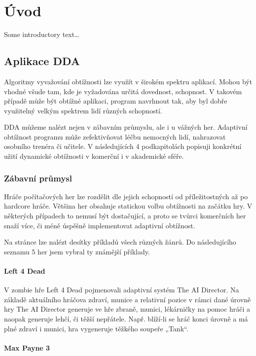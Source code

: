 \chapter{Úvod}
Some introductory text\dots

\section{Aplikace DDA}
Algoritmy vyvažování obtížnosti lze využít v širokém spektru aplikací. Mohou být vhodné všude tam, kde je vyžadována určitá dovednost, schopnost. V takovém případě může být obtížné aplikaci, program navrhnout tak, aby byl dobře využitelný velkým spektrem lidí různých schopností.

DDA můžeme nalézt nejen v zábavním průmyslu, ale i u vážných her. Adaptivní obtížnost programu může zefektivňovat léčbu nemocných lidí, nahrazovat osobního trenéra či učitele. V následujících 4 podkapitolách popisuji konkrétní užití dynamické obtížnosti v komerční i v akademické sféře.

\subsection{Zábavní průmysl}

Hráče počítačových her lze rozdělit dle jejich schopností od příležitostných až po hardcore hráče. Většina her obsahuje statickou volbu obtížnosti na začátku hry. V některých případech to nemusí být dostačující, a proto se tvůrci komerčních her snaží více, či méně úspěšně implementovat adaptivní obtížnost.

Na stránce \cite{1} lze nalézt desítky příkladů všech různých žánrů. Do následujícího seznamu 5 her jsem vybral ty známější příklady.


\subsubsection{Left 4 Dead}
\label{sec:Left4Dead}

V zombie hře Left 4 Dead pojmenovali adaptivní systém The AI Director. Na základě aktuálního hráčova zdraví, munice a relativní pozice v rámci dané úrovně hry The AI Director generuje ve hře zbraně, munici, lékárničky na pomoc hráči a naopak generuje lehčí, či těžší nepřátele. Např. blíží-li se hráč konci úrovně a má plné zdraví i munici, hra vygeneruje těžkého soupeře „Tank“. \cite{2}

\subsubsection{Max Payne 3}


